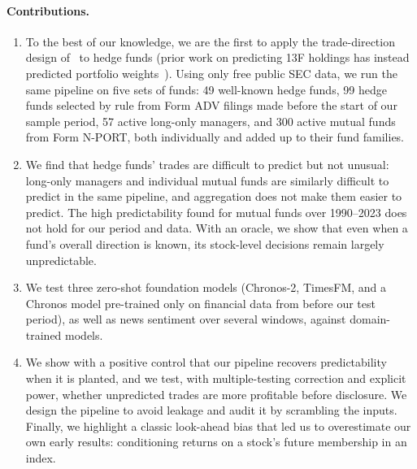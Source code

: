\paragraph{Contributions.}
\begin{enumerate}
  \item To the best of our knowledge, we are the first to apply the
  trade-direction design of~\cite{cohen2026mimicking} to hedge funds (prior
  work on predicting 13F holdings has instead predicted portfolio
  weights~\cite{izadifar2026holdings}). Using only free public SEC data, we run
  the same pipeline on five sets of funds: 49 well-known hedge funds, 99 hedge
  funds selected by rule from Form ADV filings made before the start of our
  sample period, 57 active long-only managers, and 300 active mutual funds from
  Form N-PORT, both individually and added up to their fund families.
  \item We find that hedge funds' trades are difficult to predict but not
  unusual: long-only managers and individual mutual funds are similarly
  difficult to predict in the same pipeline, and aggregation does not make
  them easier to predict. The high predictability found for mutual funds over
  1990--2023 does not hold for our period and data. With an oracle, we show
  that even when a fund's overall direction is known, its stock-level
  decisions remain largely unpredictable.
  \item We test three zero-shot foundation models (Chronos-2, TimesFM, and a
  Chronos model pre-trained only on financial data from before our test
  period), as well as news sentiment over several windows, against
  domain-trained models.
  \item We show with a positive control that our pipeline recovers
  predictability when it is planted, and we test, with multiple-testing
  correction and explicit power, whether unpredicted trades are more
  profitable before disclosure. We design the pipeline to avoid leakage and
  audit it by scrambling the inputs. Finally, we highlight a classic
  look-ahead bias that led us to overestimate our own early results:
  conditioning returns on a stock's future membership in an index.
\end{enumerate}
